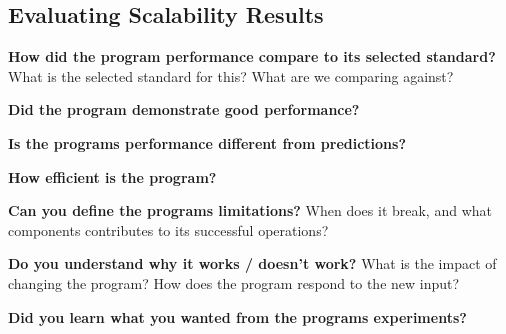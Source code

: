 \subsection{Evaluating Scalability Results}

\textbf{How did the program performance compare to its selected standard?}
What is the selected standard for this? What are we comparing against?

\textbf{Did the program demonstrate good performance?}

\textbf{Is the programs performance different from predictions?}

\textbf{How efficient is the program?}

\textbf{Can you define the programs limitations?}
When does it break, and what components contributes to its successful operations?

\textbf{Do you understand why it works / doesn't work?}
What is the impact of changing the program? How does the program respond to the new input? 

\textbf{Did you learn what you wanted from the programs experiments?}

